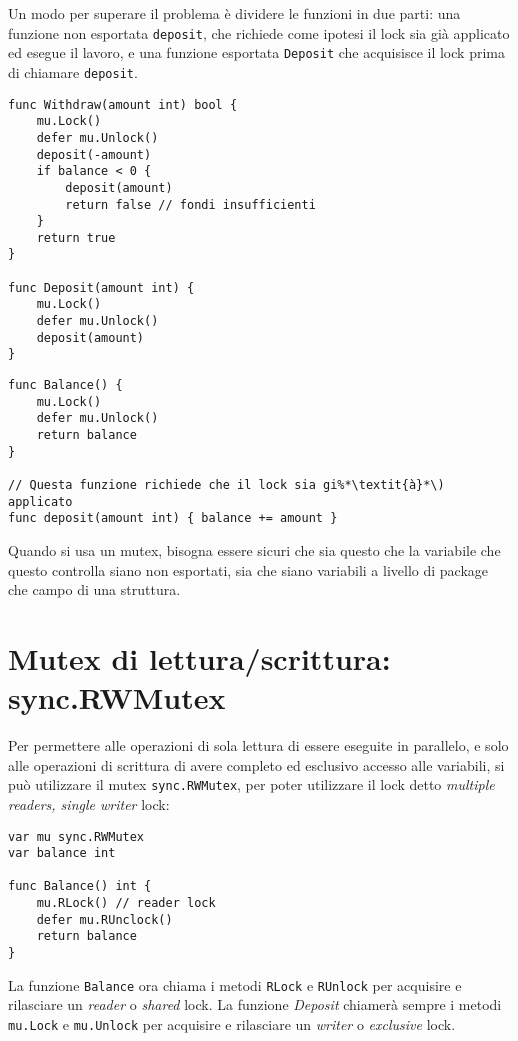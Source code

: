 Un modo per superare il problema è dividere le funzioni in due parti: una funzione non esportata \verb|deposit|, che richiede come ipotesi il lock sia già applicato ed esegue il lavoro, e una funzione esportata \verb|Deposit| che acquisisce il lock prima di chiamare \verb|deposit|.
\begin{lstlisting}[frame=single, label={lst:lstlisting9-2.6}]
func Withdraw(amount int) bool {
    mu.Lock()
    defer mu.Unlock()
    deposit(-amount)
    if balance < 0 {
        deposit(amount)
        return false // fondi insufficienti
    }
    return true
}

func Deposit(amount int) {
    mu.Lock()
    defer mu.Unlock()
    deposit(amount)
}
\end{lstlisting}
\begin{lstlisting}[frame=single, label={lst:lstlisting9-2.7}]
func Balance() {
    mu.Lock()
    defer mu.Unlock()
    return balance
}

// Questa funzione richiede che il lock sia gi%*\textit{à}*\) applicato
func deposit(amount int) { balance += amount }
\end{lstlisting}
Quando si usa un mutex, bisogna essere sicuri che sia questo che la variabile che questo controlla siano non esportati, sia che siano variabili a livello di package che campo di una struttura.


\section{Mutex di lettura/scrittura: sync.RWMutex}
\label{sec:mutex_di_lettura_scrittura_syncrwmutex}%
Per permettere alle operazioni di sola lettura di essere eseguite in parallelo, e solo alle operazioni di scrittura di avere completo ed esclusivo accesso alle variabili, si può utilizzare il mutex \verb|sync.RWMutex|, per poter utilizzare il lock detto \textit{multiple readers, single writer} lock:
\begin{lstlisting}[frame=single, label={lst:lstlisting9-3.1}]
var mu sync.RWMutex
var balance int

func Balance() int {
    mu.RLock() // reader lock
    defer mu.RUnclock()
    return balance
}
\end{lstlisting}
La funzione \verb|Balance| ora chiama i metodi \verb|RLock| e \verb|RUnlock| per acquisire e rilasciare un \textit{reader} o \textit{shared} lock.
La funzione \textit{Deposit} chiamerà sempre i metodi \verb|mu.Lock| e \verb|mu.Unlock| per acquisire e rilasciare un \textit{writer} o \textit{exclusive} lock.


